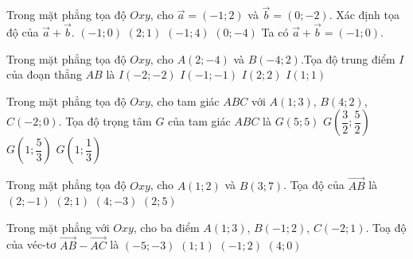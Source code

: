 \begin{ex}%
	Trong mặt phẳng tọa độ $Oxy$, cho $\overrightarrow{a}=(-1;2)$ và $\overrightarrow{b}=(0;-2)$. Xác định tọa độ của $\overrightarrow{a}+\overrightarrow{b}$.
	\choice
	{\True $(-1;0)$}
	{$(2;1)$}
	{$(-1;4)$}
	{$(0;-4)$}
	\loigiai
	{
		Ta có $\overrightarrow{a}+\overrightarrow{b}=(-1;0)$.
	}
\end{ex}
\begin{ex}%
	Trong mặt phẳng tọa độ $Oxy$, cho $A(2;-4)$ và $B(-4;2)$.Tọa độ trung điểm $I$ của đoạn thẳng $AB$ là
	\choice
	{$I(-2;-2)$}
	{\True $I(-1;-1)$}
	{$I(2;2)$}
	{$I(1;1)$}
\end{ex}
\begin{ex}%
	Trong mặt phẳng tọa độ $Oxy$, cho  tam giác $ABC$ với $A(1;3)$, $B(4;2)$, $C(-2;0)$. Tọa độ trọng tâm $G$ của tam giác $ABC$ là
	\choice
	{$G(5;5)$}
	{$G\left(\dfrac{3}{2};\dfrac{5}{2} \right)$}
	{\True $G\left(1;\dfrac{5}{3} \right)$}
	{$G\left(1;\dfrac{1}{3} \right)$}
\end{ex}

\begin{ex}%
	Trong mặt phẳng tọa độ $Oxy$, cho $A\left(1;2\right)$ và $B\left(3;7\right)$. Tọa độ của $\overrightarrow{AB}$ là
	\choice
	{$\left(2;-1\right)$}
	{$\left(2;1\right)$}
	{$\left(4;-3\right)$}
	{\True $\left(2;5\right)$}
\end{ex}
\begin{ex}%
	Trong mặt phẳng với $Oxy$, cho ba điểm $A(1;3)$, $B(-1;2)$, $C(-2;1)$. Toạ độ của véc-tơ $\overrightarrow{AB}-\overrightarrow{AC}$ là
	\choice
	{$(-5;-3)$}
	{\True $(1;1)$}
	{$(-1;2)$}
	{$(4;0)$}
\end{ex}

